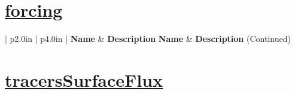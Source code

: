 \section[forcing]{\hyperref[sec:var_sec_forcing]{forcing}}
\label{sec:var_tab_forcing}

\vspace{0.5in}
{\small
\begin{center}
\begin{longtable}{| p{2.0in} | p{4.0in} |}
    \hline
    {\bf Name} & {\bf Description} \endfirsthead
    \hline 
    {\bf Name} & {\bf Description} (Continued) \endhead
    \hline
\end{longtable}
\end{center}
}
\section[tracersSurfaceFlux]{\hyperref[sec:var_sec_tracersSurfaceFlux]{tracersSurfaceFlux}}
\label{sec:var_tab_tracersSurfaceFlux}
\vspace{0.5in}
